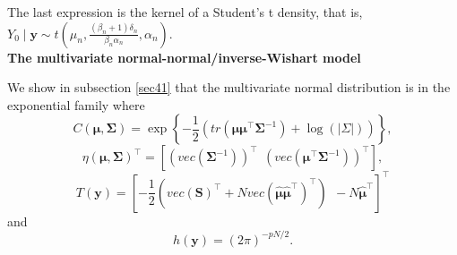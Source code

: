 \begin{enumerate}
The last expression is the kernel of a Student's t density, that is, $Y_0\mid \bm{y}\sim t\left(\mu_n,\frac{(\beta_n+1)\delta_n}{\beta_n\alpha_n},\alpha_n\right)$.\\

\textbf{The multivariate normal-normal/inverse-Wishart model}

We show in subsection \ref{sec41} that the multivariate normal distribution is in the exponential family where 
\begin{equation*}
C(\bm{\mu},\bm{\Sigma})=\exp\left\{-\frac{1}{2}\left(tr\left(\bm{\mu}\bm{\mu}^{\top}\bm{\Sigma}^{-1}\right)+\log(|\Sigma|)\right)\right\},
\end{equation*} 
\begin{equation*}
\eta(\bm{\mu},\bm{\Sigma})^{\top}=\left[\left(vec\left(\bm{\Sigma}^{-1}\right)\right)^{\top} \ \ \left(vec\left(\bm{\mu}^{\top}\bm{\Sigma}^{-1}\right)\right)^{\top}\right],
\end{equation*} 
\begin{equation*}
T(\bm{y})=\left[-\frac{1}{2}\left(vec\left(\bm{S}\right)^{\top}+N vec\left(\hat{\bm{\mu}}\hat{\bm{\mu}}^{\top}\right)^{\top}\right) \ \ -N\hat{\bm{\mu}}^{\top}\right]^{\top}
\end{equation*} and
\begin{equation*} 
h(\bm{y})=(2\pi)^{-pN/2}.
\end{equation*} 


\end{enumerate}
